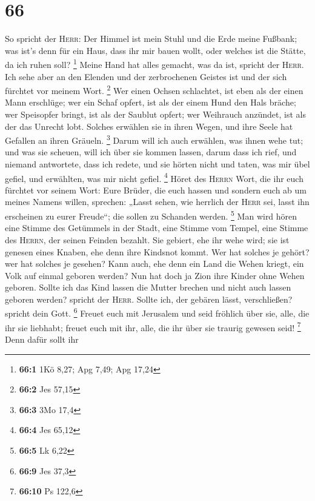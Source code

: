 \hypertarget{section-25}{%
\section{66}\label{section-25}}

 So spricht der \textsc{Herr}: Der Himmel ist mein Stuhl
und die Erde meine Fußbank; was ist's denn für ein Haus, dass ihr mir
bauen wollt, oder welches ist die Stätte, da ich ruhen soll? \footnote{\textbf{66:1}
  1Kö 8,27; Apg 7,49; Apg 17,24}  Meine Hand hat alles
gemacht, was da ist, spricht der \textsc{Herr}. Ich sehe aber an den
Elenden und der zerbrochenen Geistes ist und der sich fürchtet vor
meinem Wort. \footnote{\textbf{66:2} Jes 57,15}  Wer einen
Ochsen schlachtet, ist eben als der einen Mann erschlüge; wer ein Schaf
opfert, ist als der einem Hund den Hals bräche; wer Speisopfer bringt,
ist als der Saublut opfert; wer Weihrauch anzündet, ist als der das
Unrecht lobt. Solches erwählen sie in ihren Wegen, und ihre Seele hat
Gefallen an ihren Gräueln. \footnote{\textbf{66:3} 3Mo 17,4}
 Darum will ich auch erwählen, was ihnen wehe tut; und was
sie scheuen, will ich über sie kommen lassen, darum dass ich rief, und
niemand antwortete, dass ich redete, und sie hörten nicht und taten, was
mir übel gefiel, und erwählten, was mir nicht gefiel. \footnote{\textbf{66:4}
  Jes 65,12}  Höret des \textsc{Herrn} Wort, die ihr euch
fürchtet vor seinem Wort: Eure Brüder, die euch hassen und sondern euch
ab um meines Namens willen, sprechen: „Lasst sehen, wie herrlich der
\textsc{Herr} sei, lasst ihn erscheinen zu eurer Freude``; die sollen zu
Schanden werden. \footnote{\textbf{66:5} Lk 6,22}  Man
wird hören eine Stimme des Getümmels in der Stadt, eine Stimme vom
Tempel, eine Stimme des \textsc{Herrn}, der seinen Feinden bezahlt.
 Sie gebiert, ehe ihr wehe wird; sie ist genesen eines
Knaben, ehe denn ihre Kindsnot kommt.  Wer hat solches je
gehört? wer hat solches je gesehen? Kann auch, ehe denn ein Land die
Wehen kriegt, ein Volk auf einmal geboren werden? Nun hat doch ja Zion
ihre Kinder ohne Wehen geboren.  Sollte ich das Kind
lassen die Mutter brechen und nicht auch lassen geboren werden? spricht
der \textsc{Herr}. Sollte ich, der gebären lässt, verschließen? spricht
dein Gott. \footnote{\textbf{66:9} Jes 37,3}  Freuet euch
mit Jerusalem und seid fröhlich über sie, alle, die ihr sie liebhabt;
freuet euch mit ihr, alle, die ihr über sie traurig gewesen seid!
\footnote{\textbf{66:10} Ps 122,6}  Denn dafür sollt ihr
